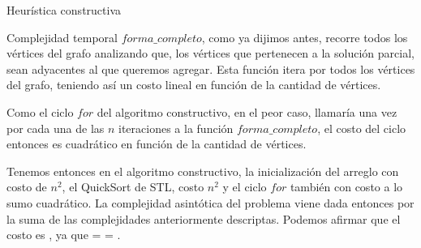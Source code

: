 \begin{section}{Heurística constructiva}
\begin{subsection}{Complejidad temporal}
			$forma\_completo$, como ya dijimos antes, recorre todos los vértices del grafo analizando que, los vértices que pertenecen a la solución parcial, sean adyacentes al que queremos agregar. Esta función itera por todos los vértices del grafo, teniendo así un costo lineal en función de la cantidad de vértices.
			
			Como el ciclo $for$ del algoritmo constructivo, en el peor caso, llamaría una vez por cada una de las $n$ iteraciones a la función $forma\_completo$, el costo del ciclo entonces es cuadrático en función de la cantidad de vértices.
			
			Tenemos entonces en el algoritmo constructivo, la inicialización del arreglo con costo de $n^2$, el QuickSort de STL, costo $n^2$ y el ciclo $for$ también con costo a lo sumo cuadrático. La complejidad asintótica del problema viene dada entonces por la suma de las complejidades anteriormente descriptas. Podemos afirmar que el costo es , ya que  =  = .
			
		\end{subsection}

\end{section}

